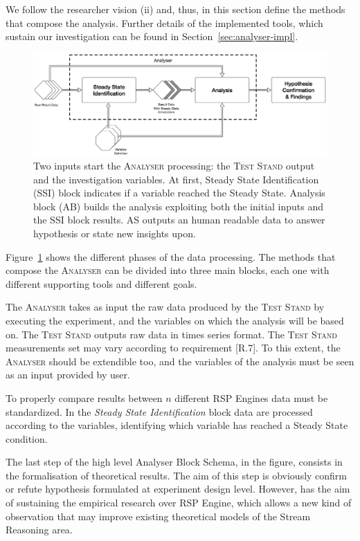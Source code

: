 We follow the researcher vision (ii) and, thus, in this section define the methods that compose the analysis. Further details of the implemented tools, which sustain our investigation can be found in Section~\ref{sec:analyser-impl}.

\begin{figure}[tbh]
  \centering
	\includegraphics[width=\linewidth]{images/analyser-block-schema}
	\caption[\textsc{Analyser} Block Schema - Design Detail Level]{Two inputs start the \textsc{Analyser} processing: the \textsc{Test Stand} output and the investigation variables. At first, Steady State Identification (SSI) block indicates if a variable reached the Steady State. Analysis block (AB) builds the analysis exploiting both the initial inputs and the SSI block results. AS outputs an human readable data to answer hypothesis or state new insights upon.}
  	\label{fig:analyser-block-schema}
\end{figure}

Figure~\ref{fig:analyser-block-schema} shows the different phases of the data processing. The methods that compose the \textsc{Analyser} can be divided into three main blocks, each one with different supporting tools and different goals.

The \textsc{Analyser} takes as input the raw data produced by the \textsc{Test Stand} by executing the experiment, and the variables on which the analysis will be based on. The \textsc{Test Stand} outputs raw data in times series format. The \textsc{Test Stand} measurements set may vary according to requirement [R.7]. To this extent, the \textsc{Analyser} should be extendible too, and the variables of the analysis must be seen as an input provided by \name user.

To properly compare results between $n$ different RSP Engines data must be standardized. In the \textit{Steady State Identification} block data are processed according to the variables, identifying which variable has reached a Steady State condition.

The last step of the high level Analyser Block Schema, in the figure, consists in the formalisation of theoretical results. The aim of this step is obviously confirm or refute hypothesis formulated at experiment design level. However, \name has the aim of sustaining the empirical research over RSP Engine, which allows a new kind of observation that may improve existing theoretical models of the Stream Reasoning area.


